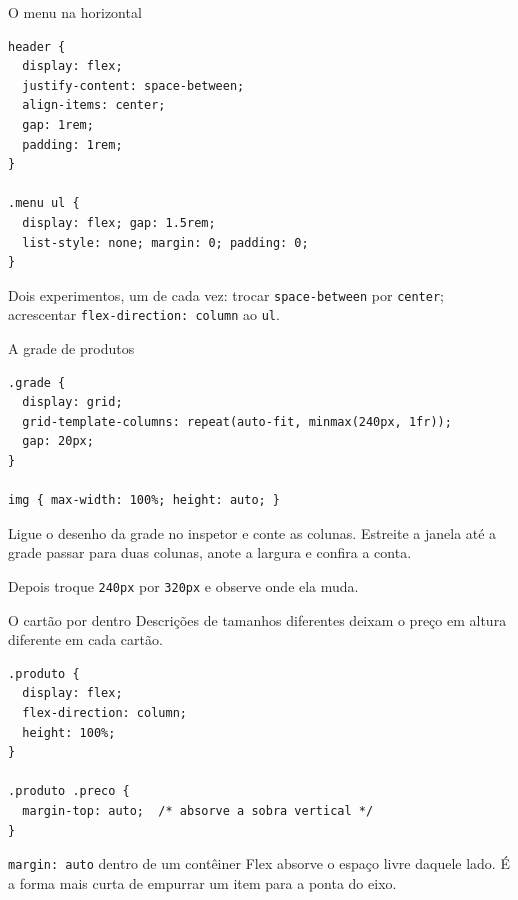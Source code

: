 \documentclass{beamer}
\begin{document}
\begin{frame}[fragile]{O menu na horizontal}
	\begin{verbatim}
header {
  display: flex;
  justify-content: space-between;
  align-items: center;
  gap: 1rem;
  padding: 1rem;
}

.menu ul {
  display: flex; gap: 1.5rem;
  list-style: none; margin: 0; padding: 0;
}
  \end{verbatim}

	\vspace{0.2cm}
	Dois experimentos, um de cada vez: trocar \texttt{space-between} por
	\texttt{center}; acrescentar \texttt{flex-direction: column} ao \texttt{ul}.
\end{frame}

\begin{frame}[fragile]{A grade de produtos}
	\begin{verbatim}
.grade {
  display: grid;
  grid-template-columns: repeat(auto-fit, minmax(240px, 1fr));
  gap: 20px;
}

img { max-width: 100%; height: auto; }
  \end{verbatim}

	\vspace{0.2cm}
	Ligue o desenho da grade no inspetor e conte as colunas. Estreite a janela até
	a grade passar para duas colunas, anote a largura e confira a conta.

	\vspace{0.2cm}
	Depois troque \texttt{240px} por \texttt{320px} e observe onde ela muda.
\end{frame}

\begin{frame}[fragile]{O cartão por dentro}
	Descrições de tamanhos diferentes deixam o preço em altura diferente em cada
	cartão.

	\begin{verbatim}
.produto {
  display: flex;
  flex-direction: column;
  height: 100%;
}

.produto .preco {
  margin-top: auto;  /* absorve a sobra vertical */
}
  \end{verbatim}

	\vspace{0.2cm}
	\texttt{margin: auto} dentro de um contêiner Flex absorve o espaço livre
	daquele lado. É a forma mais curta de empurrar um item para a ponta do eixo.
\end{frame}
\end{document}
